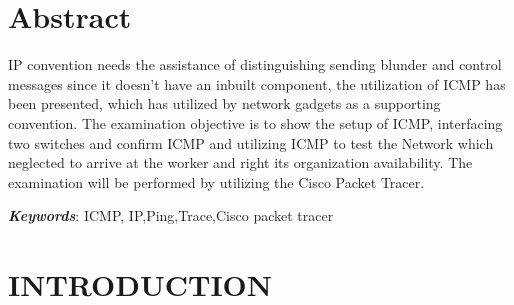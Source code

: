 \documentclass[12pt,a4paper]{article}
\begin{document}
\setcounter{page}{1}

\section*{Abstract}

IP convention needs the assistance of distinguishing sending blunder and control messages since it doesn't have an inbuilt component, the utilization of 
ICMP has been presented, which has utilized by network gadgets as a supporting convention. The examination objective is to show the setup of ICMP, 
interfacing two switches and confirm ICMP and utilizing 
ICMP to test the Network which neglected to arrive at the worker and right its organization availability. The examination will be performed by utilizing the Cisco Packet Tracer.

\textit{\textbf{Keywords}}: ICMP, IP,Ping,Trace,Cisco packet tracer

\pagebreak
\tableofcontents
\pagebreak

\listoffigures
\pagebreak

\pagebreak

\setcounter{page}{1}
{
\centering
\section{\Large{INTRODUCTION}}
}
\end{document}
